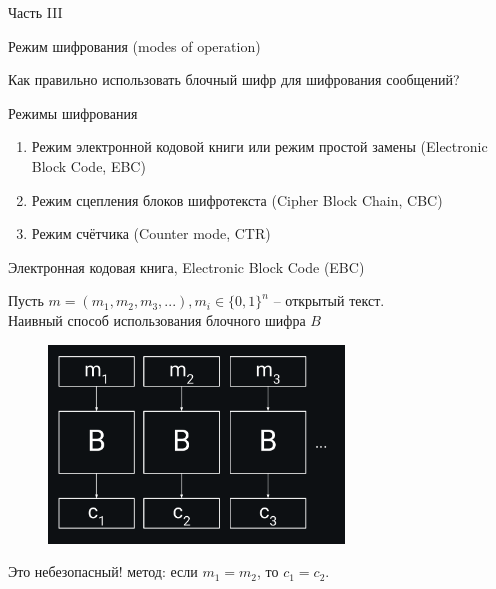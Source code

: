 \documentclass[usenames,dvipsnames,8pt,aspectratio=169]{beamer}
\begin{document}
\begin{frame}
Часть III \\ [10pt]
\begin{LARGE}
	
	\color{Orange}
	\Huge Режим шифрования (modes of operation)
	
\end{LARGE}
\end{frame}

\begin{frame}
\Huge
\centering
{\color{Orange}Как правильно использовать блочный шифр для шифрования сообщений?} \\[10pt]

\end{frame}

\begin{frame}{Режимы шифрования}
\LARGE
\centering
\begin{enumerate} 
\itemsep 10pt
\item Режим электронной кодовой книги или режим простой замены (Electronic Block Code, EBC)
\item Режим сцепления блоков шифротекста (Cipher Block Chain, CBC)
\item Режим счётчика (Counter mode, CTR)
\end{enumerate}

\end{frame}

\begin{frame}{Электронная кодовая книга, Electronic Block Code (EBC)}

\Large
Пусть $m = (m_1, m_2, m_3, ...), m_i \in \{0,1\}^n$ -- открытый текст. \\[10pt]
Наивный способ  использования блочного шифра $B$
\begin{figure}
\includegraphics[width=0.7\textwidth]{EBC}
\end{figure}
\LARGE
Это {\color{Orange} небезопасный!} метод: \quad
если $m_1 = m_2$, то $c_1 = c_2$.

\end{frame}
\end{document}
